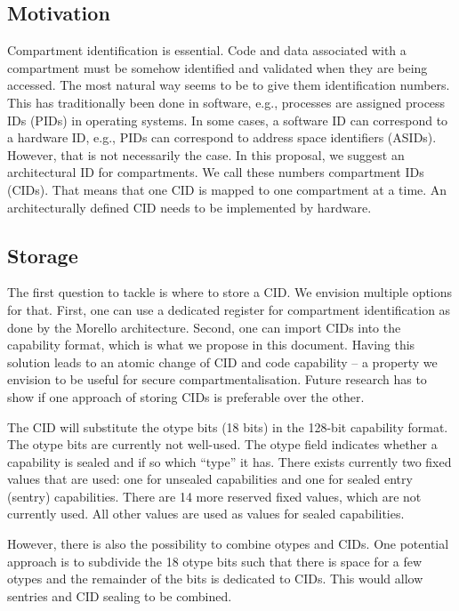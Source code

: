 \subsection{Motivation}

Compartment identification is essential. Code and data associated with a compartment must be somehow identified and validated when they are being accessed.
The most natural way seems to be to give them identification numbers.
This has traditionally been done in software, e.g., processes are assigned process IDs (PIDs) in operating systems. In some cases, a software ID can correspond to a hardware ID, e.g., PIDs can correspond to address space identifiers (ASIDs).
However, that is not necessarily the case.
In this proposal, we suggest an architectural ID for compartments.
We call these numbers compartment IDs (CIDs). That means that one CID is mapped to one compartment at a time.
An architecturally defined CID needs to be implemented by hardware.

\subsection{Storage}
\label{app:exp:subsec:storage}

The first question to tackle is where to store a CID.
We envision multiple options for that.
First, one can use a dedicated register for compartment identification as done by the Morello architecture.
Second, one can import CIDs into the capability format, which is what we propose in this document.
Having this solution leads to an atomic change of CID and code capability -- a property we envision to be useful for secure compartmentalisation.
Future research has to show if one approach of storing CIDs is preferable over the other.

The CID will substitute the otype bits (18 bits) in the 128-bit capability format.
The otype bits are currently not well-used. The otype field indicates whether a capability is sealed and if so which ``type'' it has.
There exists currently two fixed values that are used: one for unsealed capabilities and one for sealed entry (sentry) capabilities.
There are 14 more reserved fixed values, which are not currently used. All other values are used as values for sealed capabilities.

However, there is also the possibility to combine otypes and CIDs.
One potential approach is to subdivide the 18 otype bits such that there is space for a few otypes and the remainder of the bits is dedicated to CIDs.
This would allow sentries and CID sealing to be combined.


